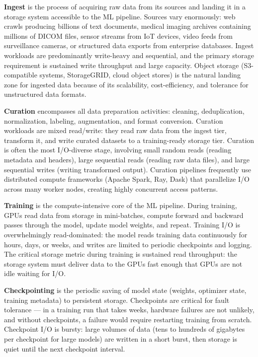 \textbf{Ingest} is the process of acquiring raw data from its sources and landing it in a storage system accessible to the ML pipeline. Sources vary enormously: web crawls producing billions of text documents, medical imaging archives containing millions of DICOM files, sensor streams from IoT devices, video feeds from surveillance cameras, or structured data exports from enterprise databases. Ingest workloads are predominantly write-heavy and sequential, and the primary storage requirement is sustained write throughput and large capacity. Object storage (S3-compatible systems, StorageGRID, cloud object stores) is the natural landing zone for ingested data because of its scalability, cost-efficiency, and tolerance for unstructured data formats.

\textbf{Curation} encompasses all data preparation activities: cleaning, deduplication, normalization, labeling, augmentation, and format conversion. Curation workloads are mixed read/write: they read raw data from the ingest tier, transform it, and write curated datasets to a training-ready storage tier. Curation is often the most I/O-diverse stage, involving small random reads (reading metadata and headers), large sequential reads (reading raw data files), and large sequential writes (writing transformed output). Curation pipelines frequently use distributed compute frameworks (Apache Spark, Ray, Dask) that parallelize I/O across many worker nodes, creating highly concurrent access patterns.

\textbf{Training} is the compute-intensive core of the ML pipeline. During training, GPUs read data from storage in mini-batches, compute forward and backward passes through the model, update model weights, and repeat. Training I/O is overwhelmingly read-dominated: the model reads training data continuously for hours, days, or weeks, and writes are limited to periodic checkpoints and logging. The critical storage metric during training is sustained read throughput: the storage system must deliver data to the GPUs fast enough that GPUs are not idle waiting for I/O.

\textbf{Checkpointing} is the periodic saving of model state (weights, optimizer state, training metadata) to persistent storage. Checkpoints are critical for fault tolerance --- in a training run that takes weeks, hardware failures are not unlikely, and without checkpoints, a failure would require restarting training from scratch. Checkpoint I/O is bursty: large volumes of data (tens to hundreds of gigabytes per checkpoint for large models) are written in a short burst, then storage is quiet until the next checkpoint interval.

